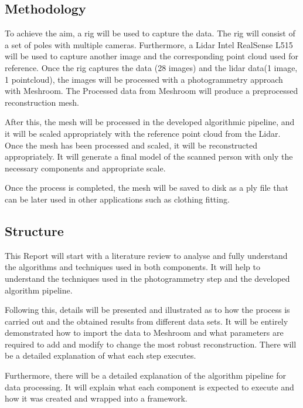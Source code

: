 \documentclass[12pt]{report}
\begin{document}
\subsection{Methodology}
To achieve the aim, a rig will be used to capture the data. The rig will consist of a set of poles with multiple cameras. Furthermore, a Lidar Intel RealSense L515 will be used to capture another image and the corresponding point cloud used for reference.
Once the rig captures the data (28 images) and the lidar data(1 image, 1 pointcloud), the images will be processed with a photogrammetry approach with Meshroom. 
The Processed data from Meshroom will produce a preprocessed reconstruction mesh. 

After this, the mesh will be processed in the developed algorithmic pipeline, and it will be scaled appropriately with the reference point cloud from the Lidar. 
Once the mesh has been processed and scaled, it will be reconstructed appropriately. It will generate a final model of the scanned person with only the necessary components and appropriate scale.

Once the process is completed, the mesh will be saved to disk as a ply file that can be later used in other applications such as clothing fitting. 


\subsection{Structure}
This Report will start with a literature review to analyse and fully understand the algorithms and techniques used in both components. 
It will help to understand the techniques used in the photogrammetry step and the developed algorithm pipeline.

Following this, details will be presented and illustrated as to how the process is carried out and the obtained results from different data sets.
It will be entirely demonstrated how to import the data to Meshroom and what parameters are required to add and modify to change the most robust reconstruction. There will be a detailed explanation of what each step executes.

Furthermore, there will be a detailed explanation of the algorithm pipeline for data processing. It will explain what each component is expected to execute and how it was created and wrapped into a framework.

\enlargethispage{\baselineskip}
\end{document}
